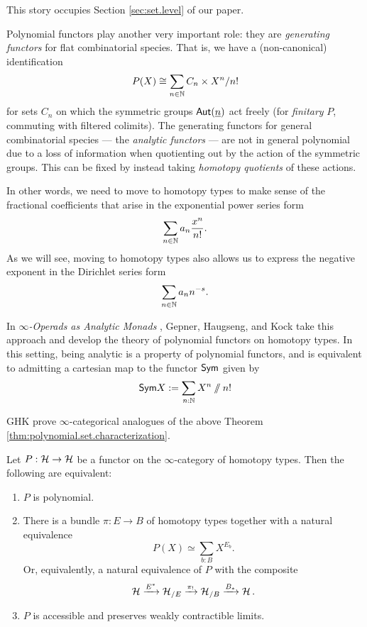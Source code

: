 This story occupies Section \ref{sec:set.level} of our paper.

Polynomial functors play another very important role: they are \emph{generating
  functors} for flat combinatorial species. That is, we have a (non-canonical)
identification
$$P(X) \cong \sum_{n \in \operatorname{\mathbb{N}}} C_n \times X^n/n!$$
for sets $C_n$ on which the symmetric groups $\operatorname{\mathsf{Aut}}(\underline{n})$ act freely
(for \emph{finitary} $P$, commuting with filtered colimits).
The generating functors for general combinatorial species --- the \emph{analytic
functors} --- are not in general polynomial due to a loss of information when
quotienting out by the action of the symmetric groups. This can be fixed by
instead taking \emph{homotopy quotients} of these actions.

In other words, we need to move to homotopy types to make sense of the
fractional coefficients that arise in the exponential power series form
$$\sum_{n \in \operatorname{\mathbb{N}}} a_n \frac{x^n}{n!}.$$
As we will see, moving to homotopy types also allows us to express the negative
exponent in the Dirichlet series form
$$\sum_{n \in \operatorname{\mathbb{N}}} a_n n^{-s}.$$

In \emph{$\infty$-Operads as Analytic Monads} \cite{GHK:Analytic.Monads},
Gepner, Haugseng, and Kock take this approach and develop the theory of
polynomial functors on homotopy types. In this setting, being analytic is a
property of  polynomial functors, and is equivalent to admitting a cartesian
map to the functor $\mathsf{{Sym}}$ given by
$$\mathsf{{Sym}}X := \sum_{n : \operatorname{\mathbb{N}}} X^n \mathbin{/\mkern-6mu/} n!$$

GHK prove $\infty$-categorical analogues of the above Theorem
\ref{thm:polynomial.set.characterization}.
\begin{thm}\label{thm:polynomial.type.characterization}
Let $P : \operatorname{\mathcal{H}} \to \operatorname{\mathcal{H}}$ be a functor on the $\infty$-category of homotopy types.
Then the following are equivalent:
  \begin{enumerate}
  \item $P$ is polynomial.
  \item There is a bundle $\pi : E \to B$ of homotopy types together with a natural equivalence
    $$P(X) \simeq \sum_{b : B} X^{E_b}.$$
    Or, equivalently, a natural equivalence of $P$ with the composite
    $$\operatorname{\mathcal{H}} \xrightarrow{E^{\ast}} \operatorname{\mathcal{H}}_{/E} \xrightarrow{\pi_!} \operatorname{\mathcal{H}}_{/B} \xrightarrow{B_\ast} \operatorname{\mathcal{H}}.$$
  \item $P$ is accessible and preserves weakly contractible limits.
  \end{enumerate}
\end{thm}

